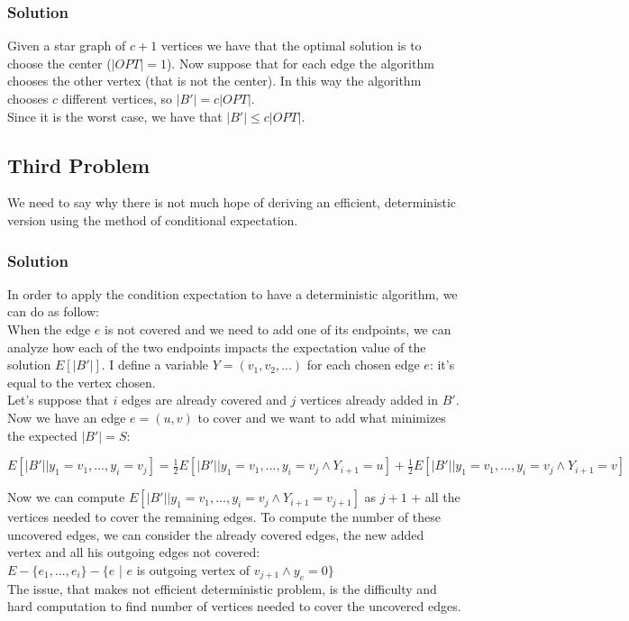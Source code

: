 \documentclass[11pt]{article}
\begin{document}
\subsubsection*{Solution}
Given a star graph of $c + 1$ vertices we have that the optimal solution is to choose the center ($|OPT| = 1$). Now suppose that for each edge the algorithm chooses the other vertex (that is not the center). In this way the algorithm chooses $c$ different vertices, so $|B'| = c|OPT|$. \\
Since it is the worst case, we have that $|B'| \le c|OPT|$.

\subsection*{Third Problem}
We need to say why there is not much hope of deriving an efficient, deterministic
version using the method of conditional expectation.
\subsubsection*{Solution}
In order to apply the condition expectation to have a deterministic algorithm, we can do as follow: \\
When the edge $e$ is not covered and we need to add one of its endpoints, we can analyze how each of the two endpoints impacts the expectation value of the solution $E[|B'|]$. I define a variable $Y=(v_1,v_2,...)$ for each chosen edge $e$: it's equal to the vertex chosen.\\
Let's suppose that $i$ edges are already covered and $j$ vertices already added in $B'$. Now we have an edge $e=(u,v)$ to cover and we want to add what minimizes the expected $|B'| = S$:
\begin{center}
	$E[|B'||y_1=v_1,...,y_i=v_j]=\frac{1}{2}E[|B'||y_1=v_1,...,y_i=v_j\land Y_{i+1}=u]+\frac{1}{2}E[|B'||y_1=v_1,...,y_i=v_j\land Y_{i+1}=v]$
\end{center}
Now we can compute $E[|B'||y_1=v_1,...,y_i=v_j\land Y_{i+1}=v_{j+1}]$ as $j + 1$ + all the vertices needed to cover the remaining edges. To compute the number of these uncovered edges, we can consider the already covered edges, the new added vertex and all his outgoing edges not covered:\\
$E-\{e_1,...,e_i\}-\{e$ | $e$ is outgoing vertex of $v_{j+1}\land y_e=0\}$\\
The issue, that makes not efficient deterministic problem, is the difficulty and hard computation to find number of vertices needed to cover the uncovered edges.
\end{document}
